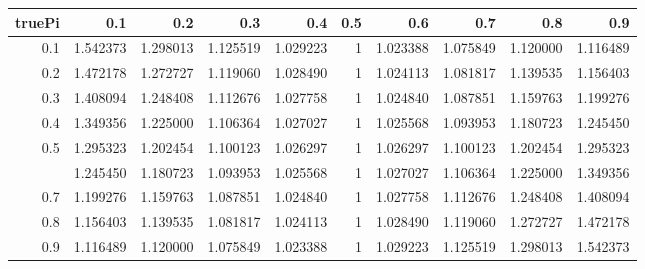 
\begin{tabular}{rrrrrrrrrr}
\toprule
truePi & 0.1 & 0.2 & 0.3 & 0.4 & 0.5 & 0.6 & 0.7 & 0.8 & 0.9\\
\midrule
0.1 & 1.542373 & 1.298013 & 1.125519 & 1.029223 & 1 & 1.023388 & 1.075849 & 1.120000 & 1.116489\\
0.2 & 1.472178 & 1.272727 & 1.119060 & 1.028490 & 1 & 1.024113 & 1.081817 & 1.139535 & 1.156403\\
0.3 & 1.408094 & 1.248408 & 1.112676 & 1.027758 & 1 & 1.024840 & 1.087851 & 1.159763 & 1.199276\\
0.4 & 1.349356 & 1.225000 & 1.106364 & 1.027027 & 1 & 1.025568 & 1.093953 & 1.180723 & 1.245450\\
0.5 & 1.295323 & 1.202454 & 1.100123 & 1.026297 & 1 & 1.026297 & 1.100123 & 1.202454 & 1.295323\\
\addlinespace
0.6 & 1.245450 & 1.180723 & 1.093953 & 1.025568 & 1 & 1.027027 & 1.106364 & 1.225000 & 1.349356\\
0.7 & 1.199276 & 1.159763 & 1.087851 & 1.024840 & 1 & 1.027758 & 1.112676 & 1.248408 & 1.408094\\
0.8 & 1.156403 & 1.139535 & 1.081817 & 1.024113 & 1 & 1.028490 & 1.119060 & 1.272727 & 1.472178\\
0.9 & 1.116489 & 1.120000 & 1.075849 & 1.023388 & 1 & 1.029223 & 1.125519 & 1.298013 & 1.542373\\
\bottomrule
\end{tabular}
